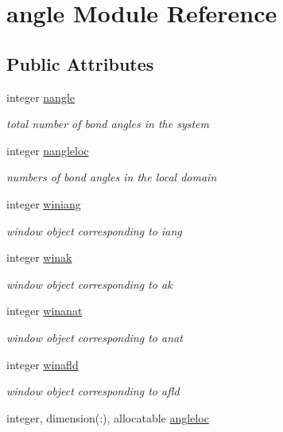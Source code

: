 \hypertarget{classangle}{\section{angle Module Reference}
\label{classangle}
}
\subsection*{Public Attributes}
\begin{DoxyCompactItemize}
\item 
integer \hyperlink{classangle_a401aae16b66326a502f845b4697902b1}{nangle}
\begin{DoxyCompactList}\small\item\em total number of bond angles in the system \end{DoxyCompactList}\item 
integer \hyperlink{classangle_a4707c3874420f6c094c961bd2d798f11}{nangleloc}
\begin{DoxyCompactList}\small\item\em numbers of bond angles in the local domain \end{DoxyCompactList}\item 
integer \hyperlink{classangle_a68986d70390a9e829c333cc9abfb035b}{winiang}
\begin{DoxyCompactList}\small\item\em window object corresponding to iang \end{DoxyCompactList}\item 
integer \hyperlink{classangle_a4d5150f5ef2c908ca41d79ffa47bef99}{winak}
\begin{DoxyCompactList}\small\item\em window object corresponding to ak \end{DoxyCompactList}\item 
integer \hyperlink{classangle_a29408b2de55b5b467872218f68b45bf6}{winanat}
\begin{DoxyCompactList}\small\item\em window object corresponding to anat \end{DoxyCompactList}\item 
integer \hyperlink{classangle_a5d36413fbeccef4bfce525004cb0ce6e}{winafld}
\begin{DoxyCompactList}\small\item\em window object corresponding to afld \end{DoxyCompactList}\item 
integer, dimension(\-:), allocatable \hyperlink{classangle_aba2bc32b2b8c849f07359000e638b674}{angleloc}

\end{DoxyCompactItemize}
